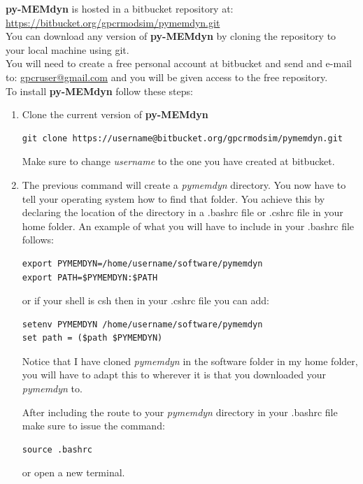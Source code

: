 \documentclass[10pt, oneside, pdftex]{article}
\begin{document}
\noindent \textbf{py-MEMdyn} is hosted in a bitbucket repository at:\\

\noindent \url{https://bitbucket.org/gpcrmodsim/pymemdyn.git}\\

\noindent  You  can  download  any version  of  \textbf{py-MEMdyn}  by
cloning the repository to your local machine using git.\\

\noindent You will need to create a free personal account at bitbucket
and send and e-mail to: \url{gpcruser@gmail.com} and you will be given
access to the free repository.\\

\noindent To install \textbf{py-MEMdyn} follow these steps:
\begin{enumerate}
\item{Clone the current version of \textbf{py-MEMdyn}
\begin{Verbatim}
git clone https://username@bitbucket.org/gpcrmodsim/pymemdyn.git
\end{Verbatim}
Make sure to change \textit{username} to the one you have created 
at bitbucket.}

\item{The previous  command will create a  \textit{pymemdyn} directory.
You now have to tell your operating system how to find that folder. You
achieve this by declaring the location of the directory in a .bashrc 
file or .cshrc file in your home folder. 
An example of what you will  have to include in your .bashrc file follows:
\begin{Verbatim}
export PYMEMDYN=/home/username/software/pymemdyn
export PATH=$PYMEMDYN:$PATH
\end{Verbatim}
or if your shell is csh then in your .cshrc file you can add:
\begin{Verbatim}
setenv PYMEMDYN /home/username/software/pymemdyn
set path = ($path $PYMEMDYN)
\end{Verbatim}

Notice that I have cloned \textit{pymemdyn} in the software folder in 
my home folder, you will have to adapt this to wherever it is that you downloaded
your \textit{pymemdyn} to.

After including the route to your \textit{pymemdyn} directory in your
.bashrc file make sure to issue the command:
\begin{Verbatim}
source .bashrc
\end{Verbatim}
or open a new terminal.\\

}
\end{enumerate}
\end{document}
